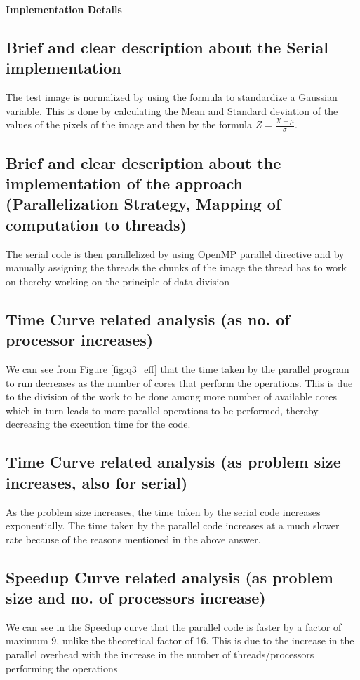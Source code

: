 \documentclass[runningheads, a4paper, oribibl]{llncs}
\begin{document}
\textbf{Implementation Details}
\subsection{Brief and clear description about the Serial implementation}
The test image is normalized by using the formula to standardize a Gaussian variable. This is done by calculating the Mean and Standard deviation of the values of the pixels of the image and then by the formula $Z=\frac{X-\mu}{\sigma}$.

\subsection{Brief and clear description about the implementation of the approach (Parallelization Strategy, Mapping of computation to threads)}
The serial code is then parallelized by using OpenMP parallel directive and by manually assigning the threads the chunks of the image the thread has to work on thereby working on the principle of data division

\subsection{Time Curve related analysis (as no. of processor increases)}
We can see from Figure \ref{fig:q3_eff} that the time taken by the parallel program to run decreases as the number of cores that perform the operations. This is due to the division of the work to be done among more number of available cores which in turn leads to more parallel operations to be performed, thereby decreasing the execution time for the code.

\subsection{Time Curve related analysis (as problem size increases, also for serial)}
As the problem size increases, the time taken by the serial code increases exponentially. The time taken by the parallel code increases at a much slower rate because of the reasons mentioned in the above answer.

\subsection{Speedup Curve related analysis (as problem size and no. of processors increase)}
We can see in the Speedup curve that the parallel  code is faster by a factor of maximum 9, unlike the theoretical factor of 16. This is due to the increase in the parallel overhead with the increase in the number of threads/processors performing the operations
\end{document}
